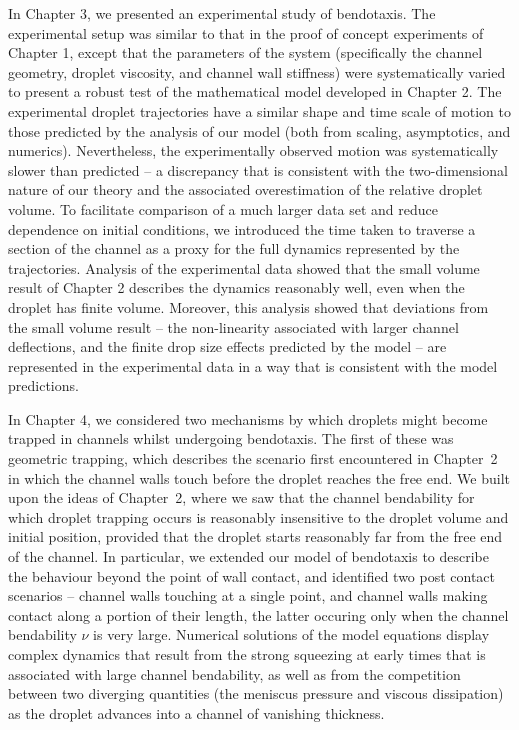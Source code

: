 In Chapter 3, we presented an experimental study of bendotaxis. The experimental setup was similar to that in the proof of concept experiments of Chapter 1, except that the parameters of the system (specifically the channel geometry, droplet viscosity, and channel wall stiffness) were systematically varied to present a robust test of the mathematical model developed in Chapter 2. The experimental droplet trajectories have a similar shape and time scale of motion to those predicted by the analysis of our model (both from scaling, asymptotics, and numerics). Nevertheless, the experimentally observed motion was systematically slower than predicted -- a discrepancy that is consistent with the two-dimensional nature of our theory and the  associated overestimation of the relative droplet volume. To facilitate comparison of a much larger data set and reduce dependence on initial conditions, we introduced the time taken to traverse a section of the channel as a proxy for the full dynamics represented by the trajectories. Analysis of the experimental data showed that the small volume result of Chapter 2 describes the dynamics reasonably well, even when the droplet has finite volume. Moreover, this analysis showed that deviations from the small volume result -- the non-linearity associated with larger channel deflections, and the finite drop size effects predicted by the model -- are represented in the experimental data in a way that is consistent with the model predictions. 

In Chapter 4, we considered two mechanisms by which droplets might become trapped in channels whilst undergoing bendotaxis. The first of these was geometric trapping, which describes the scenario first encountered in Chapter~2 in which the channel walls touch before the droplet reaches the free end. We built upon the ideas of Chapter~2, where we saw that the channel bendability for which droplet trapping occurs is reasonably insensitive to the droplet volume and initial position, provided that the droplet starts reasonably far from the free end of the channel. In particular, we extended our model of bendotaxis to describe the behaviour beyond the point of wall contact, and identified two post contact  scenarios -- channel walls touching at a single point, and channel walls making contact along a portion of their length, the latter occuring only when the channel bendability $\nu$ is very large. Numerical solutions of the model equations display complex dynamics that result from the strong squeezing at early times that is associated with large channel bendability, as well as from the competition between two diverging quantities (the meniscus pressure and viscous dissipation) as the droplet advances into a channel of vanishing thickness. 

